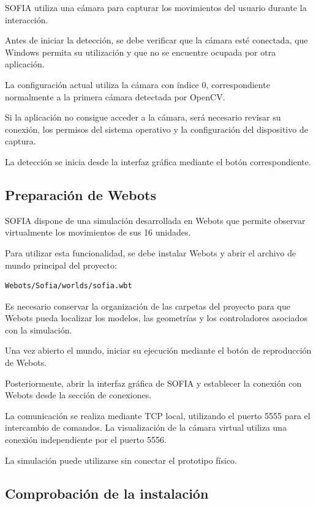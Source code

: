 \documentclass[letterpaper,journal]{IEEEtran}
\begin{document}
SOFIA utiliza una cámara para capturar los
movimientos del usuario durante la interacción.

Antes de iniciar la detección, se debe verificar
que la cámara esté conectada, que Windows permita
su utilización y que no se encuentre ocupada
por otra aplicación.

La configuración actual utiliza la cámara con
índice 0, correspondiente normalmente a la
primera cámara detectada por OpenCV.

Si la aplicación no consigue acceder a la
cámara, será necesario revisar su conexión,
los permisos del sistema operativo y la
configuración del dispositivo de captura.

La detección se inicia desde la interfaz gráfica
mediante el botón correspondiente.

\subsection{Preparación de Webots}

SOFIA dispone de una simulación desarrollada
en Webots que permite observar virtualmente
los movimientos de sus 16 unidades.

Para utilizar esta funcionalidad, se debe
instalar Webots y abrir el archivo de mundo
principal del proyecto:

\begin{verbatim}
Webots/Sofia/worlds/sofia.wbt
\end{verbatim}

Es necesario conservar la organización de las
carpetas del proyecto para que Webots pueda
localizar los modelos, las geometrías y los
controladores asociados con la simulación.

Una vez abierto el mundo, iniciar su ejecución
mediante el botón de reproducción de Webots.

Posteriormente, abrir la interfaz gráfica de
SOFIA y establecer la conexión con Webots
desde la sección de conexiones.

La comunicación se realiza mediante TCP local,
utilizando el puerto 5555 para el intercambio
de comandos. La visualización de la cámara
virtual utiliza una conexión independiente
por el puerto 5556.

La simulación puede utilizarse sin conectar
el prototipo físico.

\subsection{Comprobación de la instalación}
\end{document}
